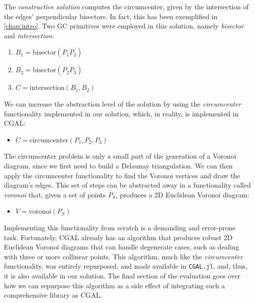 The \textit{constructive solution} computes the circumcenter, given by the
intersection of the edges' perpendicular bisectors.  In fact, this has been
exemplified in \cref{chap:intro}.  Two \ac{GC} primitives were employed in this
solution, namely \textit{bisector} and \textit{intersection}.

\begin{enumerate}
  \item $B_1 = \mathrm{bisector}\left(\overline{P_1 P_2}\right)$
  \item $B_2 = \mathrm{bisector}\left(\overline{P_2 P_3}\right)$
  \item $C = \mathrm{intersection}\left(B_1, B_2\right)$
\end{enumerate}

We can increase the abstraction level of the solution by using the
\textit{circumcenter} functionality implemented in our solution, which, in
reality, is implemented in \ac{CGAL}:

\begin{itemize}
  \item[] $C = \mathrm{circumcenter}\left(P_1, P_2, P_3\right)$
\end{itemize}

The circumcenter problem is only a small part of the generation of a Voronoi
diagram, since we first need to build a Delaunay triangulation.  We can then 
apply the $\mathrm{circumcenter}$ functionality to find the Voronoi vertices and
draw the diagram's edges.  This set of steps can be abstracted away in a
functionality called \textit{voronoi} that, given a set of points $P_S$,
produces a 2D Euclidean Voronoi diagram:

\begin{itemize}
  \item[] $V = \mathrm{voronoi}\left(P_S\right)$
\end{itemize}

Implementing this functionality from scratch is a demanding and error-prone
task.  Fortunately, \ac{CGAL} already has an algorithm that produces robust 2D
Euclidean Voronoi diagrams that can handle degenerate cases, such as dealing
with three or more collinear points.  This algorithm, much like the
\textit{circumcenter} functionality, was entirely repurposed, and made available
in \texttt{CGAL.jl}, and, thus, it is also available in our solution.  The final
section of the evaluation goes over how we can repurpose this algorithm as a
side effect of integrating such a comprehensive library as \ac{CGAL}.

